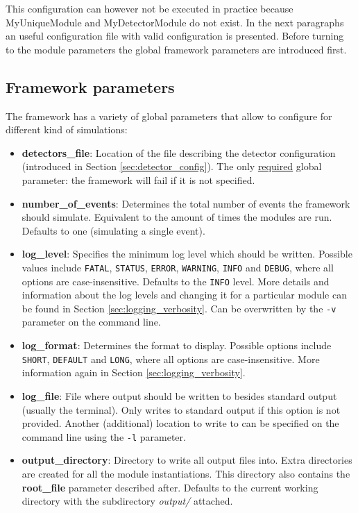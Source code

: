 This configuration can however not be executed in practice because MyUniqueModule and MyDetectorModule do not exist. In the next paragraphs an useful configuration file with valid configuration is presented. Before turning to the module parameters the global framework parameters are introduced first.

\subsection{Framework parameters}
\label{sec:framework_parameters}
The framework has a variety of global parameters that allow to configure \apsq for different kind of simulations:
\begin{itemize}
\item \textbf{detectors\_file}: Location of the file describing the detector configuration (introduced in Section \ref{sec:detector_config}). The only \underline{required} global parameter: the framework will fail if it is not specified.
\item \textbf{number\_of\_events}: Determines the total number of events the framework should simulate. Equivalent to the amount of times the modules are run. Defaults to one (simulating a single event).
\item \textbf{log\_level}: Specifies the minimum log level which should be written. Possible values include \texttt{FATAL}, \texttt{STATUS}, \texttt{ERROR}, \texttt{WARNING}, \texttt{INFO} and \texttt{DEBUG}, where all options are case-insensitive. Defaults to the \texttt{INFO} level. More details and information about the log levels and changing it for a particular module can be found in Section \ref{sec:logging_verbosity}. Can be overwritten by the \texttt{-v} parameter on the command line.
\item \textbf{log\_format}: Determines the format to display. Possible options include \texttt{SHORT}, \texttt{DEFAULT} and \texttt{LONG}, where all options are case-insensitive. More information again in Section \ref{sec:logging_verbosity}.
\item \textbf{log\_file}: File where output should be written to besides standard output (usually the terminal). Only writes to standard output if this option is not provided. Another (additional) location to write to can be specified on the command line using the \texttt{-l} parameter.
\item \textbf{output\_directory}: Directory to write all output files into. Extra directories are created for all the module instantiations. This directory also contains the \textbf{root\_file} parameter described after. Defaults to the current working directory with the subdirectory \textit{output/} attached.

\end{itemize}
